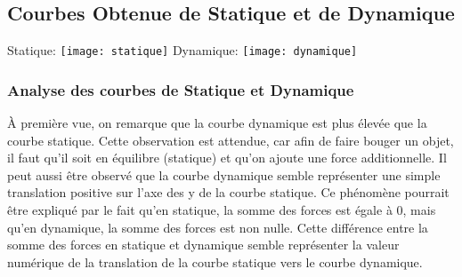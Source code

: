 \documentclass{article}
\begin{document}
\subsection{Courbes Obtenue de Statique et de Dynamique}
Statique:
\newline
\noindent \texttt{[image: statique]}
\newline
\noindent Dynamique:
\newline
\noindent \texttt{[image: dynamique]}

\subsubsection{Analyse des courbes de Statique et Dynamique}
À première vue, on remarque que la courbe dynamique est plus élevée que la courbe statique. Cette observation est attendue, car afin de faire bouger un objet, il faut qu'il soit en équilibre (statique) et qu'on ajoute une force additionnelle. Il peut aussi être observé que la courbe dynamique semble représenter une simple translation positive sur l'axe des y de la courbe statique. Ce phénomène pourrait être expliqué par le fait qu'en statique, la somme des forces est égale à 0, mais qu'en dynamique, la somme des forces est non nulle. Cette différence entre la somme des forces en statique et dynamique semble représenter la valeur numérique de la translation de la courbe statique vers le courbe dynamique.
\end{document}
